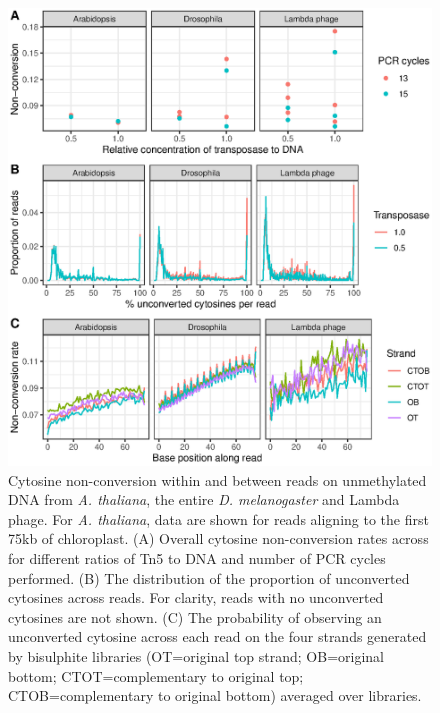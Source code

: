\documentclass[twocolumn,twoside,lettersize]{article}
\begin{document}
\begin{figure}
  \begin{center}
    \includegraphics{figure1.eps}
    \caption{
        Cytosine non-conversion within and between reads on unmethylated DNA from \textit{A. thaliana}, the entire \textit{D. melanogaster} and Lambda phage. For \textit{A. thaliana}, data are shown for reads aligning to the first 75kb of chloroplast.
        (A) Overall cytosine non-conversion rates across for different ratios of Tn5 to DNA and number of PCR cycles performed.
        (B) The distribution of the proportion of unconverted cytosines across reads. For clarity, reads with no unconverted cytosines are not shown.
        (C) The probability of observing an unconverted cytosine across each read on the four strands generated by bisulphite libraries (OT=original top strand; OB=original bottom; CTOT=complementary to original top; CTOB=complementary to original bottom) averaged over libraries.
    }
    \label{fig:reads}
  \end{center}
\end{figure}
\end{document}
